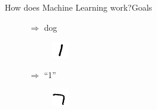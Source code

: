 \documentclass{beamer}
\begin{document}
\begin{frame}{How does Machine Learning work?}{Goals}
\begin{itemize}
\begin{figure}[H]
\begin{subfigure}{.1\textwidth}
		\end{subfigure} $\Rightarrow$ dog
	\end{figure}
	\begin{figure}[H]
		\begin{subfigure}{.1\textwidth}
			\includegraphics[width=\textwidth]{MNIST_cl_1_0} 
		\end{subfigure} $\Rightarrow$ ``1''
		\begin{subfigure}{.1\textwidth}
			\includegraphics[width=\textwidth]{MNIST_cl_7_0}

\end{subfigure}
\end{figure}
\end{itemize}
\end{frame}
\end{document}
